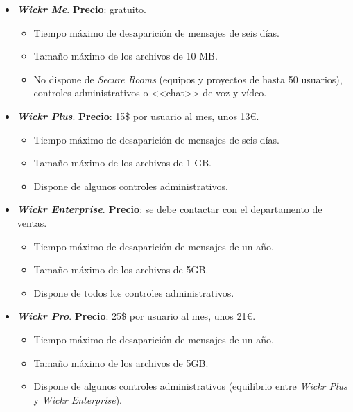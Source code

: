 \begin{itemize}
	\item \textbf{\textit{Wickr Me}}. \textbf{Precio}: gratuito.
	
	\begin{itemize}
		\item Tiempo máximo de desaparición de mensajes de seis días.
		\item Tamaño máximo de los archivos de 10 \acs{MB}.
		\item No dispone de \textit{Secure Rooms} (equipos y proyectos de hasta 50 usuarios), controles administrativos o <<chat>> de voz y vídeo.		
	\end{itemize}

	\newpage

	\item \textbf{\textit{Wickr Plus}}. \textbf{Precio}: 15\$ por usuario al mes, unos 13\euro{}.
	
	\begin{itemize}
		\item Tiempo máximo de desaparición de mensajes de seis días.
		\item Tamaño máximo de los archivos de 1 \acs{GB}.
		\item Dispone de algunos controles administrativos.
	\end{itemize}

	\item \textbf{\textit{Wickr Enterprise}}. \textbf{Precio}: se debe contactar con el departamento de ventas.

	\begin{itemize}
		\item Tiempo máximo de desaparición de mensajes de un año.
		\item Tamaño máximo de los archivos de 5\acs{GB}.
		\item Dispone de todos los controles administrativos.
	\end{itemize}

	\item \textbf{\textit{Wickr Pro}}. \textbf{Precio}: 25\$ por usuario al mes, unos 21\euro{}.

	\begin{itemize}
		\item Tiempo máximo de desaparición de mensajes de un año.
		\item Tamaño máximo de los archivos de 5\acs{GB}.
		\item Dispone de algunos controles administrativos (equilibrio entre \textit{Wickr Plus} y \textit{Wickr Enterprise}).
	\end{itemize}

\end{itemize}

